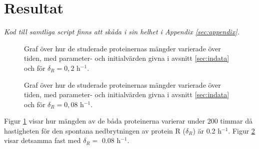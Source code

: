 \section{Resultat}
\label{sec:resultat}

\emph{Kod till samtliga script finns att skåda i sin helhet i Appendix \ref{sec:appendix}.}

\begin{figure}[H]
	\centering
	
	\caption{Graf över hur de studerade proteinernas mängder varierade över tiden, med parameter- och initialvärden givna i avsnitt \ref{sec:indata} och för $\delta_R = 0,2$ h$^{-1}$.}
	\label{fig:GenOsc}
\end{figure}

\begin{figure}[H]
	\centering
	
	\caption{Graf över hur de studerade proteinernas mängder varierade över tiden, med parameter- och initialvärden givna i avsnitt \ref{sec:indata} och för $\delta_R = 0,08$ h$^{-1}$.}
	\label{fig:GenOsc008}
\end{figure}

Figur \ref{fig:GenOsc} visar hur mängden av de båda proteinerna varierar under 200 timmar då hastigheten för den spontana nedbrytningen av protein R ($\delta_R$) är 0.2 h$^{-1}$. Figur \ref{fig:GenOsc008} visar detsamma fast med $\delta_R =$ 0.08 h$^{-1}$.

